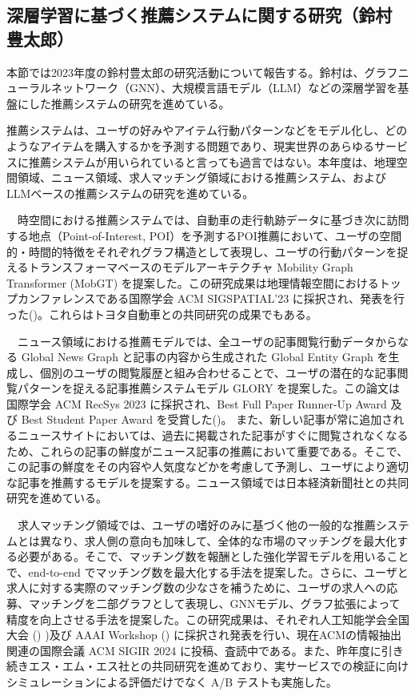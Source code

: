 
\subsection{深層学習に基づく推薦システムに関する研究（鈴村 豊太郎）}

本節では2023年度の鈴村豊太郎の研究活動について報告する。鈴村は、グラフニューラルネットワーク（GNN）、大規模言語モデル（LLM）などの深層学習を基盤にした推薦システムの研究を進めている。

推薦システムは、ユーザの好みやアイテム行動パターンなどをモデル化し、どのようなアイテムを購入するかを予測する問題であり、現実世界のあらゆるサービスに推薦システムが用いられていると言っても過言ではない。本年度は、地理空間領域、ニュース領域、求人マッチング領域における推薦システム、およびLLMベースの推薦システムの研究を進めている。

　時空間における推薦システムでは、自動車の走行軌跡データに基づき次に訪問する地点（Point-of-Interest, POI）を予測するPOI推薦において、ユーザの空間的・時間的特徴をそれぞれグラフ構造として表現し、ユーザの行動パターンを捉えるトランスフォーマベースのモデルアーキテクチャ Mobility Graph Transformer (MobGT) を提案した。この研究成果は地理情報空間におけるトップカンファレンスである国際学会 ACM SIGSPATIAL'23 に採択され、発表を行った(\cite{mobgt})。これらはトヨタ自動車との共同研究の成果でもある。

　ニュース領域における推薦モデルでは、全ユーザの記事閲覧行動データからなる Global News Graph と記事の内容から生成された Global Entity Graph を生成し、個別のユーザの閲覧履歴と組み合わせることで、ユーザの潜在的な記事閲覧パターンを捉える記事推薦システムモデル GLORY を提案した。この論文は国際学会 ACM RecSys 2023 に採択され、Best Full Paper Runner-Up Award 及び Best Student Paper Award を受賞した(\cite{glory})。
また、新しい記事が常に追加されるニュースサイトにおいては、過去に掲載された記事がすぐに閲覧されなくなるため、これらの記事の鮮度がニュース記事の推薦において重要である。そこで、この記事の鮮度をその内容や人気度などかを考慮して予測し、ユーザにより適切な記事を推薦するモデルを提案する。ニュース領域では日本経済新聞社との共同研究を進めている。

　求人マッチング領域では、ユーザの嗜好のみに基づく他の一般的な推薦システムとは異なり、求人側の意向も加味して、全体的な市場のマッチングを最大化する必要がある。そこで、マッチング数を報酬とした強化学習モデルを用いることで、end-to-end でマッチング数を最大化する手法を提案した。さらに、ユーザと求人に対する実際のマッチング数の少なさを補うために、ユーザの求人への応募、マッチングを二部グラフとして表現し、GNNモデル、グラフ拡張によって精度を向上させる手法を提案した。この研究成果は、それぞれ人工知能学会全国大会 (\cite{job-jsai})
)及び AAAI Workshop (\cite{job-aaai}) に採択され発表を行い、現在ACMの情報抽出関連の国際会議 ACM SIGIR 2024 に投稿、査読中である。また、昨年度に引き続きエス・エム・エス社との共同研究を進めており、実サービスでの検証に向けシミュレーションによる評価だけでなく A/B テストも実施した。

